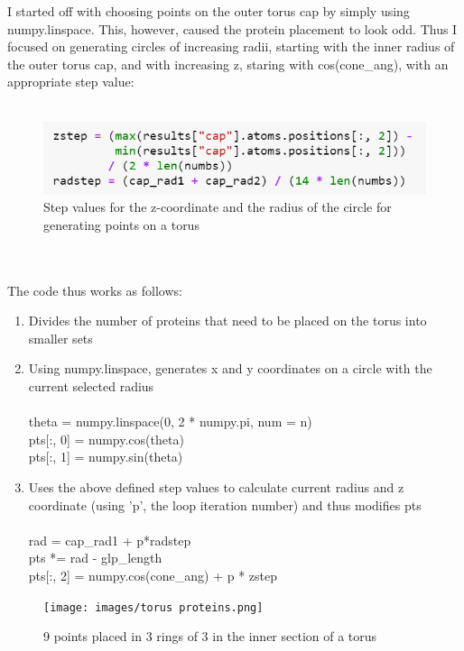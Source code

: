 \documentclass[12pt, a4paper]{report}
\begin{document}
I started off with choosing points on the outer torus cap by simply using numpy.linspace. This, however, caused the protein placement to look odd. Thus I focused on generating circles of increasing radii, starting with the inner radius of the outer torus cap, and with increasing z, staring with cos(cone\_ang), with an appropriate step value: 
\\~\\ 
\begin{figure}[h]
    \centering 
    \includegraphics[scale=0.9]{images/steps in torus.png} 
    \centering 
    \caption{Step values for the z-coordinate and the radius of the circle for generating points on a torus} 
\end{figure} 
\\~\\
The code thus works as follows: 
\begin{enumerate}
    \item Divides the number of proteins that need to be placed on the torus into smaller sets 
    \item Using numpy.linspace, generates x and y coordinates on a circle with the current selected radius 
    \\~\\ 
    theta = numpy.linspace(0, 2 * numpy.pi, num = n) 
    \\
    pts[:, 0] = numpy.cos(theta) 
    \\
    pts[:, 1] = numpy.sin(theta) 
    \item Uses the above defined step values to calculate current radius and z coordinate (using 'p', the loop iteration number) and thus modifies pts 
    \\~\\  
    rad = cap\_rad1 + p*radstep 
    \\ 
    pts *= rad - glp\_length
    \\ 
    pts[:, 2] = numpy.cos(cone\_ang) + p * zstep
\end{enumerate} 

\begin{figure}[h]
    \texttt{[image: images/torus proteins.png]} 
    \centering 
    \caption{9 points placed in 3 rings of 3 in the inner section of a torus}
    \centering
\end{figure} 
\end{document}
